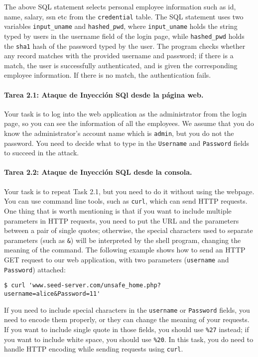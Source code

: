 The above SQL statement selects personal employee information such as id,
name, salary, ssn etc from the {\tt credential} table. The SQL statement
uses two variables \texttt{input\_uname} and \texttt{hashed\_pwd},
where \texttt{input\_uname} holds the string typed by 
users in the username field of the login page, while 
\texttt{hashed\_pwd} holds the \texttt{sha1} hash of the password typed by
the user. The program checks whether 
any record matches with the provided username and password; if there is a match,
the user is successfully authenticated, and is given the corresponding 
employee information. If there is no match, the authentication
fails. 



\paragraph{Tarea 2.1: Ataque de Inyección SQl desde la página web.}
Your task is to log into the web application as 
the administrator from the login page, so you can see the information of
all the employees. We assume that you do know the administrator's account name
which is {\tt admin}, but you do not the password. You need to decide
what to type in the \texttt{Username} and \texttt{Password} fields to
succeed in the attack.
	


\paragraph{Tarea 2.2: Ataque de Inyección SQL desde la consola.}  
Your task is to repeat Task 2.1, but you need to do it without 
using the webpage. You can use command line tools, such as 
\texttt{curl}, which can send HTTP requests. 
One thing that is worth mentioning is that if you
want to include multiple parameters in HTTP requests, you need to put the
URL and the parameters between a pair of single quotes; otherwise, the 
special characters used to separate parameters (such as \texttt{\&}) will be
interpreted by the shell program, changing the meaning of the 
command. The following example shows how to send an HTTP GET request to our 
web application, with two parameters (\texttt{username} and 
\texttt{Password}) attached:

\begin{lstlisting}
$ curl 'www.seed-server.com/unsafe_home.php?username=alice&Password=11'
\end{lstlisting}

If you need to include special characters in the 
\texttt{username} or \texttt{Password} fields, you need to 
encode them properly, or they can change the meaning of your 
requests. If you want to include single quote in those fields,
you should use \texttt{\%27} instead; if you want to include
white space, you should use \texttt{\%20}. In this
task, you do need to handle HTTP encoding while sending
requests using \texttt{curl}.




